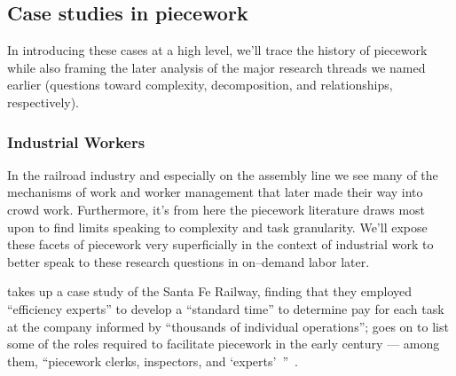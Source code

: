 \documentclass[trackingWork]{subfiles}
\begin{document}
\subsection{Case studies in piecework}
In introducing these cases at a high level,
we'll trace the history of piecework
while also framing the later analysis of the major research threads we named earlier
(questions toward complexity, decomposition, and relationships, respectively).



\begin{comment}
What did I pull from the threads that are related to industrial and railroad workers (i.e. 1920 onward?)

- Graves: railway companies used ``efficiency experts'' to study how long tasks should take
- Hart: evaluation limits complexity (we can affect that with peer evaluation!)
- Graves: sparks of Scientific Management in Piecework
- organization types are important determinants of piecework viability: lots of types of tasks? bad
  - Hart (I think?): variability in *worker* quality is fine
- Foreman is important
- Worker advocacy groups arose to speak out against piecework

\end{comment}

\subsubsection{Industrial Workers}
In the railroad industry and especially on the assembly line
we see many of the mechanisms of work and worker management that later made their way into crowd work.
Furthermore, it's from here the piecework literature draws most upon to find limits speaking to complexity and task granularity.
We'll expose these facets of piecework very superficially in the context of industrial work
to better speak to these research questions in on--demand labor later.

\citeauthor{10.2307/23702539} takes up a case study of the Santa Fe Railway,
finding that they employed ``efficiency experts'' to develop a ``standard time''
to determine pay for each task at the company informed by
``thousands of individual operations''; %
\citeauthor{10.2307/23702539} goes on to list
some of the roles required to facilitate piecework
in the early  century
--- among them, ``piecework clerks, inspectors, and `experts'~''~\cite{10.2307/23702539}.
\end{document}
